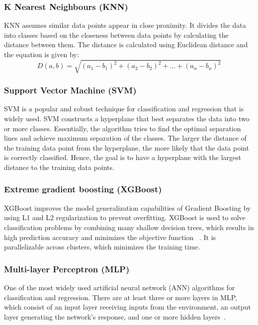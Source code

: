 \documentclass[conference]{IEEEtran}
\begin{document}
\subsubsection{K Nearest Neighbours (KNN)}
KNN assumes similar data points appear in close proximity. It divides the data into classes based on the closeness between data points by calculating the distance between them. The distance is calculated using Euclidean distance and the equation is given by: 
\begin{displaymath}
D(a,b) = \sqrt{(a_1 - b_1)^2 + (a_2 - b_2)^2 + ... + (a_n - b_n)^2}
\end{displaymath}

\subsubsection{Support Vector Machine (SVM)}
SVM is a popular and robust technique for classification and regression that is widely used. SVM constructs a hyperplane that best separates the data into two or more classes. Essentially, the algorithm tries to find the optimal separation lines and achieve maximum separation of the classes. The larger the distance of the training data point from the hyperplane, the more likely that the data point is correctly classified. Hence, the goal is to have a hyperplane with the largest distance to the training data points.

\subsubsection{Extreme gradient boosting (XGBoost)}
XGBoost improves the model generalization capabilities of Gradient Boosting by using L1 and L2 regularization to prevent overfitting. XGBoost is used to solve classification problems by combining many shallow decision trees, which results in high prediction accuracy and minimizes the objective function ~\cite{yusri2022water}. It is parallelizable across clusters, which minimizes the training time.

\subsubsection{Multi-layer Perceptron (MLP)}
One of the most widely used artificial neural network (ANN) algorithms for classification and regression. There are at least three or more layers in MLP, which consist of an input layer receiving inputs from the environment, an output layer generating the network's response, and one or more hidden layers~\cite{najah2011application}. 
\end{document}
